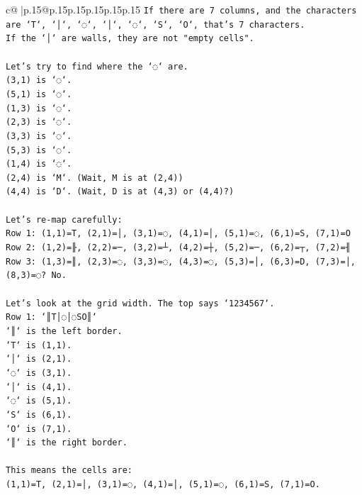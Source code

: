 \documentclass{article}
\begin{document}
{\begin{supertabular}{c@{$\;$}|p{.15\linewidth}@{}p{.15\linewidth}p{.15\linewidth}p{.15\linewidth}p{.15\linewidth}p{.15\linewidth}}
{{{\texttt{If there are 7 columns, and the characters are `T`, `│`, `◌`, `│`, `◌`, `S`, `O`, that's 7 characters.} \\
\texttt{If the `│` are walls, they are not "empty cells".} \\
\\ 
\texttt{Let's try to find where the `◌` are.} \\
\texttt{(3,1) is `◌`.} \\
\texttt{(5,1) is `◌`.} \\
\texttt{(1,3) is `◌`.} \\
\texttt{(2,3) is `◌`.} \\
\texttt{(3,3) is `◌`.} \\
\texttt{(5,3) is `◌`.} \\
\texttt{(1,4) is `◌`.} \\
\texttt{(2,4) is `M`. (Wait, M is at (2,4))} \\
\texttt{(4,4) is `D`. (Wait, D is at (4,3) or (4,4)?)} \\
\\ 
\texttt{Let's re{-}map carefully:} \\
\texttt{Row 1: (1,1)=T, (2,1)=│, (3,1)=◌, (4,1)=│, (5,1)=◌, (6,1)=S, (7,1)=O} \\
\texttt{Row 2: (1,2)=╟, (2,2)=─, (3,2)=┴, (4,2)=┼, (5,2)=─, (6,2)=┬, (7,2)=╢} \\
\texttt{Row 3: (1,3)=║, (2,3)=◌, (3,3)=◌, (4,3)=◌, (5,3)=│, (6,3)=D, (7,3)=│, (8,3)=◌? No.} \\
\\ 
\texttt{Let's look at the grid width. The top says `1234567`.} \\
\texttt{Row 1: `║T│◌│◌SO║`} \\
\texttt{`║` is the left border.} \\
\texttt{`T` is (1,1).} \\
\texttt{`│` is (2,1).} \\
\texttt{`◌` is (3,1).} \\
\texttt{`│` is (4,1).} \\
\texttt{`◌` is (5,1).} \\
\texttt{`S` is (6,1).} \\
\texttt{`O` is (7,1).} \\
\texttt{`║` is the right border.} \\
\\ 
\texttt{This means the cells are:} \\
\texttt{(1,1)=T, (2,1)=│, (3,1)=◌, (4,1)=│, (5,1)=◌, (6,1)=S, (7,1)=O.} \\
}}}
\end{supertabular}}
\end{document}
